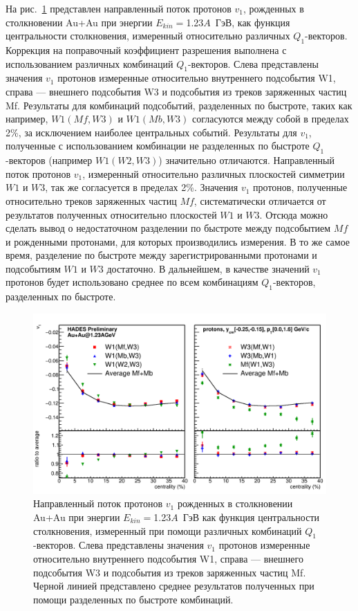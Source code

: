 На рис.~\ref{fig:hades_w1w3} представлен направленный поток протонов $v_1$, рожденных в столкновении Au+Au при энергии $E_{kin}=$1.23$A$~ГэВ, как функция центральности столкновения, измеренный относительно различных $Q_1$-векторов. 
Коррекция на поправочный коэффициент разрешения выполнена с использованием различных комбинаций $Q_1$-векторов.
Слева представлены значения $v_1$ протонов измеренные относительно внутреннего подсобытия W1, справа --- внешнего подсобытия W3 и подсобытия из треков заряженных частиц Mf. 
Результаты для комбинаций подсобытий, разделенных по быстроте, таких как например, $W1(Mf,W3)$ и $W1(Mb,W3)$ согласуются между собой в пределах 2\%, за исключением наиболее центральных событий. 
Результаты для $v_1$, полученные с использованием комбинации не разделенных по быстроте $Q_1$-векторов (например $W1(W2,W3)$) значительно отличаются.
Направленный поток протонов $v_1$, измеренный относительно различных плоскостей симметрии $W1$ и $W3$, так же согласуется в пределах 2\%.
Значения $v_1$ протонов, полученные относительно треков заряженных частиц $Mf$, систематически отличается от результатов полученных относительно плоскостей $W1$ и $W3$. 
Отсюда можно сделать вывод о недостаточном разделении по быстроте между подсобытием $Mf$ и рожденными протонами, для которых производились измерения.
В то же самое время, разделение по быстроте между зарегистрированными протонами и подсобытиям $W1$ и $W3$ достаточно.
В дальнейшем, в качестве значений $v_1$ протонов будет использовано среднее по всем комбинациям $Q_1$-векторов, разделенных по быстроте.
%
\begin{figure}[ht]
\begin{center}
\includegraphics[width=0.75\linewidth]{images/W1AndW3Nucleus.png}
\caption{Направленный поток протонов $v_1$ рожденных в столкновении Au+Au при энергии $E_{kin}=$1.23$A$~ГэВ как функция центральности столкновения, измеренный при помощи различных комбинаций $Q_1$-векторов. Слева представлены значения $v_1$ протонов измеренные относительно внутреннего подсобытия W1, справа --- внешнего подсобытия W3 и подсобытия из треков заряженных частиц Mf. Черной линией представлено среднее результатов полученных при помощи разделенных по быстроте комбинаций.}
\label{fig:hades_w1w3}
\end{center}
\end{figure}

